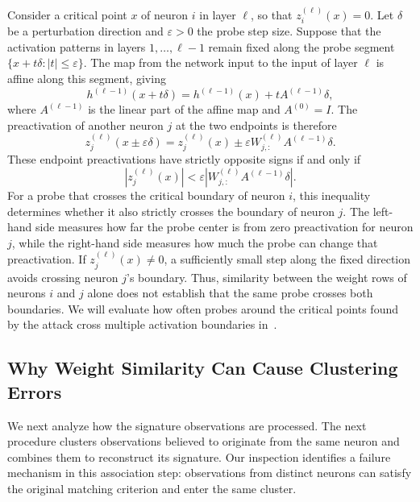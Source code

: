 \documentclass[runningheads]{llncs}
\begin{document}
Consider a critical point $x$ of neuron $i$ in layer $\ell$, so that $z_i^{(\ell)}(x)=0$.
Let $\delta$ be a perturbation direction and $\varepsilon>0$ the probe step size.
Suppose that the activation patterns in layers $1,\ldots,\ell-1$ remain fixed along the probe segment $\{x+t\delta:|t|\leq\varepsilon\}$.
The map from the network input to the input of layer $\ell$ is affine along this segment, giving
\begin{equation*}
h^{(\ell-1)}(x+t\delta)=h^{(\ell-1)}(x)+tA^{(\ell-1)}\delta,
\end{equation*}
where $A^{(\ell-1)}$ is the linear part of the affine map and $A^{(0)}=I$.
The preactivation of another neuron $j$ at the two endpoints is therefore
\begin{equation*}
z_j^{(\ell)}(x\pm\varepsilon\delta)=z_j^{(\ell)}(x)\pm\varepsilon W_{j,:}^{(\ell)}A^{(\ell-1)}\delta.
\end{equation*}
These endpoint preactivations have strictly opposite signs if and only if
\begin{equation*}
\left|z_j^{(\ell)}(x)\right|<\varepsilon\left|W_{j,:}^{(\ell)}A^{(\ell-1)}\delta\right|.
\end{equation*}
For a probe that crosses the critical boundary of neuron $i$, this inequality determines whether it also strictly crosses the boundary of neuron $j$.
The left-hand side measures how far the probe center is from zero preactivation for neuron $j$, while the right-hand side measures how much the probe can change that preactivation.
If $z_j^{(\ell)}(x)\ne0$, a sufficiently small step along the fixed direction avoids crossing neuron $j$'s boundary.
Thus, similarity between the weight rows of neurons $i$ and $j$ alone does not establish that the same probe crosses both boundaries.
We will evaluate how often probes around the critical points found by the attack cross multiple activation boundaries in~.

\subsection{Why Weight Similarity Can Cause Clustering Errors}
\label{sec:clustering-failure}
We next analyze how the signature observations are processed.
The next procedure clusters observations believed to originate from the same neuron and combines them to reconstruct its signature.
Our inspection identifies a failure mechanism in this association step: observations from distinct neurons can satisfy the original matching criterion and enter the same cluster.
\end{document}
